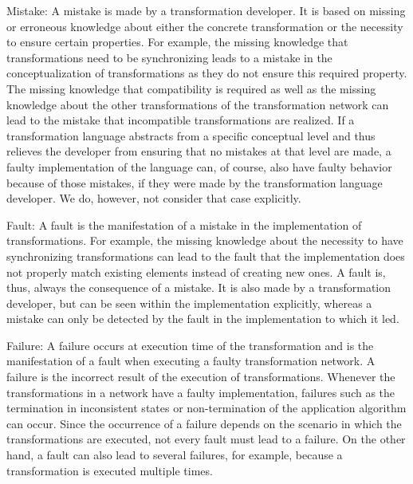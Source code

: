 \begin{properdescription}
    \item[Mistake:] 
    A mistake is made by a transformation developer. It is based on missing or erroneous knowledge about either the concrete transformation or the necessity to ensure certain properties. For example, the missing knowledge that transformations need to be synchronizing leads to a mistake in the conceptualization of transformations as they do not ensure this required property. The missing knowledge that compatibility is required as well as the missing knowledge about the other transformations of the transformation network can lead to the mistake that incompatible transformations are realized.
    If a transformation language abstracts from a specific conceptual level and thus relieves the developer from ensuring that no mistakes at that level are made, a faulty implementation of the language can, of course, also have faulty behavior because of those mistakes, if they were made by the transformation language developer. We do, however, not consider that case explicitly. 
    \item[Fault:] 
    A fault is the manifestation of a mistake in the implementation of transformations. For example, the missing knowledge about the necessity to have synchronizing transformations can lead to the fault that the implementation does not properly match existing elements instead of creating new ones. A fault is, thus, always the consequence of a mistake. It is also made by a transformation developer, but can be seen within the implementation explicitly, whereas a mistake can only be detected by the fault in the implementation to which it led.
    \item[Failure:] 
    A failure occurs at execution time of the transformation and is the manifestation of a fault when executing a faulty transformation network. A failure is the incorrect result of the execution of transformations. Whenever the transformations in a network have a faulty implementation, failures such as the termination in inconsistent states or non-termination of the application algorithm can occur. Since the occurrence of a failure depends on the scenario in which the transformations are executed, not every fault must lead to a failure. On the other hand, a fault can also lead to several failures, for example, because a transformation is executed multiple times.
\end{properdescription}


